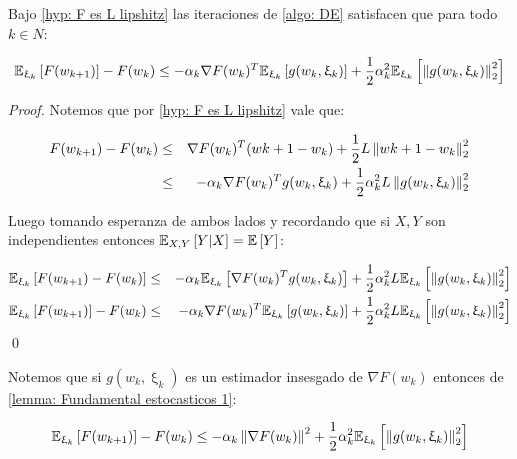 \begin{lemma}
	\label{lemma: Fundamental estocasticos 1}
	Bajo \ref{hyp: F es L lipshitz} las iteraciones de \ref{algo: DE} satisfacen que para todo $k \in N$:
	
	\begin{equation}
	\mathbb{E}_{\upxi_{k}} \left[F(w_{k+1})\right] - F(w_k) \leq - \alpha_k \nabla F(w_k) ^T \mathbb{E}_{\upxi_{k}} \left[g(w_k, \upxi_{k})\right] + \frac{1}{2} \alpha_k^2 \mathbb{E}_{\upxi_{k}} \left[\left\lVert g(w_k, \upxi_{k})\right\rVert^2_2\right]
	\end{equation}
	
\end{lemma}

\begin{proof}
	Notemos que por \ref{hyp: F es L lipshitz} vale que:
	
	\begin{equation*}
	\begin{aligned}
	F(w_{k+1}) - F(w_k) & \leq &  \nabla F(w_k)^T(w{k+1}-w_k) + \frac{1}{2}L \left\lVert w{k+1}-w_k\right\rVert^2_2 \\
	& \leq & - \alpha_k \nabla F(w_k)^Tg(w_k, \upxi_{k}) + \frac{1}{2} \alpha_k^2 L \left\lVert g(w_k, \upxi_{k})\right\rVert^2_2 
	\end{aligned}
	\end{equation*}
	
	
	Luego tomando esperanza de ambos lados y recordando que si $X,Y$ son independientes entonces $\mathbb{E}_{X,Y} \left[Y \vert X\right] = \mathbb{E} \left[Y\right]$:
	
	\begin{equation*}
	\begin{aligned}
	\mathbb{E}_{\upxi_{k}} \left[F(w_{k+1}) - F(w_k)\right] & \leq & - \alpha_k \mathbb{E}_{\upxi_{k}} \left[\nabla F(w_k)^Tg(w_k, \upxi_{k})\right] + \frac{1}{2} \alpha_k^2 L \mathbb{E}_{\upxi_{k}} \left[\left\lVert g(w_k, \upxi_{k})\right\rVert^2_2 \right] \\
	\mathbb{E}_{\upxi_{k}} \left[F(w_{k+1})\right] - F(w_k) & \leq & - \alpha_k \nabla F(w_k)^T \mathbb{E}_{\upxi_{k}} \left[g(w_k, \upxi_{k})\right]+ \frac{1}{2} \alpha_k^2 L \mathbb{E}_{\upxi_{k}} \left[\left\lVert g(w_k, \upxi_{k})\right\rVert^2_2 \right] 
	\end{aligned}
	\end{equation*}
	\qed
	
\end{proof}

\begin{remark}
	Notemos que si $g(w_k, \upxi_{k})$ es un estimador insesgado de $\nabla F (w_k)$ entonces de \ref{lemma: Fundamental estocasticos 1}:
	
	\begin{equation}
	\mathbb{E}_{\upxi_{k}} \left[F(w_{k+1})\right] - F(w_k) \leq - \alpha_k \left\lVert\nabla F(w_k)\right\rVert^2 + \frac{1}{2} \alpha_k^2 \mathbb{E}_{\upxi_{k}} \left[\left\lVert g(w_k, \upxi_{k})\right\rVert^2_2\right]
	\end{equation}
	
\end{remark}

